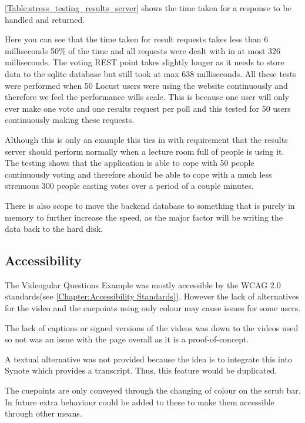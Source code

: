 \autoref{Table:stress_testing_results_server} shows the time taken for a response to be handled and returned.

Here you can see that the time taken for result requests takes less than 6 milliseconds 50\% of the time and all requests were dealt with in at most 326 milliseconds. The voting REST point takes slightly longer as it needs to store data to the sqlite database but still took at max 638 milliseconds. All these tests were performed when 50 Locust users were using the website continuously and therefore we feel the performance wills scale. This is because one user will only ever make one vote and one results request per poll and this tested for 50 users continuously making these requests.

Although this is only an example this ties in with requirement  that the results server should perform normally when a lecture room full of people is using it. The testing shows that the application is able to cope with 50 people continuously voting and therefore should be able to cope with a much less strenuous 300 people casting votes over a period of a couple minutes.

There is also scope to move the backend database to something that is purely in memory to further increase the speed, as the major factor will be writing the data back to the hard disk.

\subsection{Accessibility}
\label{Subsection: vqe accessibility}

The \gls{Videogular} Questions Example was mostly accessible by the WCAG 2.0 standards(see \autoref{Chapter:Accessibility Standards}). However the lack of alternatives for the video and the cuepoints using only colour may cause issues for some users.

The lack of captions or signed versions of the videos was down to the videos used so not was an issue with the page overall as it is a proof-of-concept.

A textual alternative was not provided because the idea is to integrate this into Synote which provides a transcript. Thus, this feature would be duplicated.

The cuepoints are only conveyed through the changing of colour on the scrub bar. In future extra behaviour could be added to these to make them accessible through other means.

